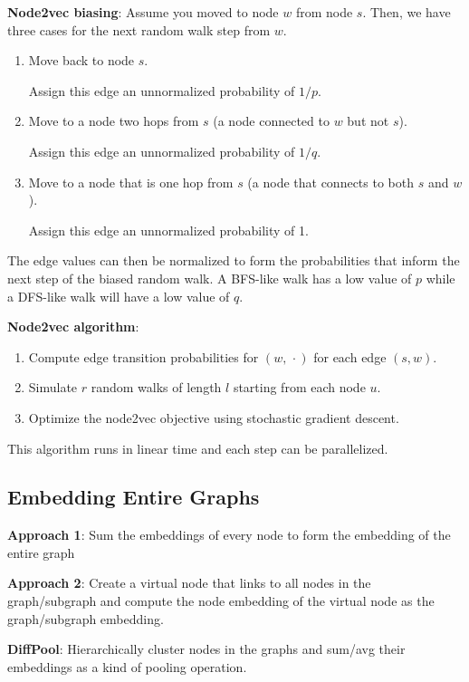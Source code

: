 \documentclass[12pt]{article}
\begin{document}
\medskip
\textbf{Node2vec biasing}: Assume you moved to node $w$ from node $s$. Then, we have
three cases for the next random walk step from $w$.

\begin{enumerate}
  \item Move back to node $s$.

    Assign this edge an unnormalized probability of $1/p$.
  \item Move to a node two hops from $s$ (a node connected to $w$ but not $s$).

    Assign this edge an unnormalized probability of $1/q$.
  \item Move to a node that is one hop from $s$ (a node that connects to both
    $s$ and $w$).

    Assign this edge an unnormalized probability of 1.
\end{enumerate}

The edge values can then be normalized to form the probabilities that inform the
next step of the biased random walk. A BFS-like walk has a low value of $p$
while a DFS-like walk will have a low value of $q$.

\medskip
\textbf{Node2vec algorithm}:

\begin{enumerate}
  \item Compute edge transition probabilities for $(w,\,\cdot)$ for each edge
    $(s, w)$.
  \item Simulate $r$ random walks of length $l$ starting from each node $u$.
  \item Optimize the node2vec objective using stochastic gradient descent.
\end{enumerate}

This algorithm runs in linear time and each step can be parallelized.

\subsection*{Embedding Entire Graphs}

\textbf{Approach 1}: Sum the embeddings of every node to form the embedding of
the entire graph

\medskip
\textbf{Approach 2}: Create a virtual node that links to all nodes in the
graph/subgraph and compute the node embedding of the virtual node as the
graph/subgraph embedding.

\medskip
\textbf{DiffPool}: Hierarchically cluster nodes in the graphs and sum/avg their
embeddings as a kind of pooling operation.
\end{document}
